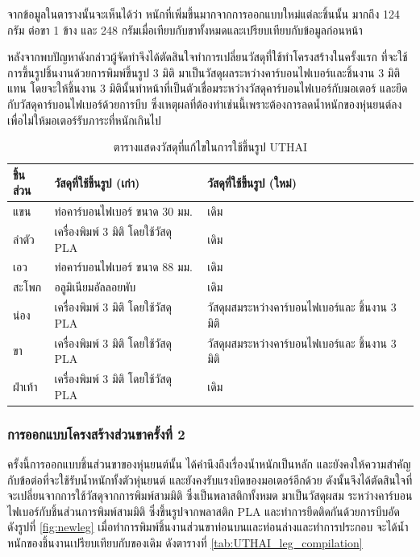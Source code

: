 จากข้อมูลในตารางนั้นจะเห็นได้ว่า หนักที่เพิ่มขึ้นมากจากการออกแบบใหม่แต่ละชิ้นนั้น มากถึง 124 กรัม
ต่อขา 1 ข้าง และ 248 กรัมเมื่อเทียบกับขาทั้งหมดและเปรียบเทียบกับข้อมูลก่อนหน้า

หลังจากพบปัญหาดังกล่าวผู้จัดทำจึงได้ตัดสินใจทำการเปลี่ยนวัสดุที่ใช้ทำโครงสร้างในครั้งแรก
ที่จะใช้การขึ้นรูปชิ้นงานด้วยการพิมพ์ขึ้นรูป 3 มิติ มาเป็นวัสดุผลระหว่างคาร์บอนไฟเบอร์และชิ้นงาน 3 มิติแทน
โดยจะให้ชิ้นงาน 3 มิตินั้นทำหน้าที่เป็นตัวเชื่อมระหว่างวัสดุคาร์บอนไฟเบอร์กับมอเตอร์ และยึดกับวัสดุคาร์บอนไฟเบอร์ด้วยการบีบ
ซึ่งเหตุผลที่ต้องทำเช่นนี้เพราะต้องการลดน้ำหนักของหุ่นยนต์ลง เพื่อไม่ให้มอเตอร์รับภาระที่หนักเกินไป 

\begin{table}[ht]
	\centering
	\begin{tabular}{| l | l | l |}
		\hline
		ชิ้นส่วน & วัสดุที่ใช้ขึ้นรูป (เก่า) & วัสดุที่ใช้ขึ้นรูป (ใหม่) \\
        \hline
        แขน	& ท่อคาร์บอนไฟเบอร์ ขนาด 30 มม. & เดิม\\
        ลำตัว & เครื่องพิมพ์ 3 มิติ โดยใช้วัสดุ PLA & เดิม\\
        เอว	& ท่อคาร์บอนไฟเบอร์ ขนาด 88 มม. & เดิม\\
        สะโพก & อลูมิเนียมอัลลอยพับ & เดิม\\
        น่อง & เครื่องพิมพ์ 3 มิติ โดยใช้วัสดุ PLA & วัสดุผสมระหว่างคาร์บอนไฟเบอร์และ ชิ้นงาน 3 มิติ \\
        ขา & เครื่องพิมพ์ 3 มิติ โดยใช้วัสดุ PLA  & วัสดุผสมระหว่างคาร์บอนไฟเบอร์และ ชิ้นงาน 3 มิติ\\
        ฝ่าเท้า	& เครื่องพิมพ์ 3 มิติ โดยใช้วัสดุ PLA & เดิม\\
	    \hline
	\end{tabular}
	\caption{ตารางแสดงวัสดุที่แก้ไขในการใช้ขึ้นรูป UTHAI }
	\label{tab:UTHAI_materialchange}
\end{table}

\clearpage
\subsubsection{การออกแบบโครงสร้างส่วนขาครั้งที่ 2}
ครั้งนี้การออกแบบชิ้นส่วนขาของหุ่นยนต์นั้น ได้คำนึงถึงเรื่องน้ำหนักเป็นหลัก และยังคงให้ความสำคัญกับข้อต่อที่จะใช้รับน้ำหนักทั้งตัวหุ่นยนต์
และยังคงรับแรงบิดของมอเตอร์อีกด้วย ดังนั้นจึงได้ตัดสินใจที่จะเปลี่ยนจากการใช้วัสดุจากการพิมพ์สามมิติ  ซึ่งเป็นพลาสติกทั้งหมด มาเป็นวัสดุผสม 
ระหว่างคาร์บอนไฟเบอร์กับชิ้นส่วนการพิมพ์สามมิติ ซึ่งขึ้นรูปจากพลาสติก PLA และทำการยึดติดกันด้วยการบีบอัด ดังรูปที่ \ref{fig:newleg}
เมื่อทำการพิมพ์ชิ้นงานส่วนขาท่อนบนและท่อนล่างและทำการประกอบ จะได้น้ำหนักของชิ้นงานเปรียบเทียบกับของเดิม ดังตารางที่ \ref{tab:UTHAI_leg_compilation}

